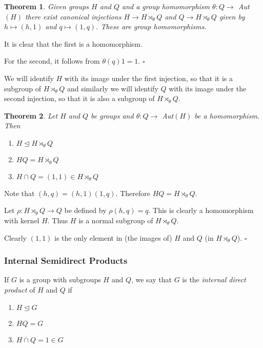 \documentclass[10pt]{article}
\newtheorem{theorem}{Theorem}[section]
\newenvironment{proof}[1][Proof]{\begin{trivlist}
\item[\hskip \labelsep {\itshape #1}]}{\end{trivlist}}
\newenvironment{definition}[1][Definition]{\begin{trivlist}
\item[\hskip \labelsep {\bfseries #1}]}{\end{trivlist}}
\begin{document}
\begin{theorem}
Given groups $H$ and $Q$ and a group homomorphism $\theta : Q \to$ Aut$(H)$ there exist canonical injections $H \to H\rtimes_{\theta} Q$ and $Q \to H\rtimes_{\theta} Q$ given by $h \mapsto (h, 1)$ and $q \mapsto (1, q)$. These are group homomorphisms.
\end{theorem}

\begin{proof}
It is clear that the first is a homomorphism.

For the second, it follows from $\theta(q)1 = 1$. $\square$
\end{proof}

We will identify $H$ with its image under the first injection, so that it is a subgroup of $H\rtimes_{\theta} Q$ and similarly we will identify $Q$ with its image under the second injection, so that it is also a subgroup of $H\rtimes_{\theta} Q$.

\begin{theorem}
Let $H$ and $Q$ be groups and $\theta : Q \to$ Aut$(H)$ be a homomorphism. Then
\begin{enumerate}
\item $H \mathrel{\unlhd} H\rtimes_{\theta} Q$
\item $HQ = H\rtimes_{\theta} Q$
\item $H\cap Q = (1, 1) \in H\rtimes_{\theta} Q$
\end{enumerate}
\end{theorem}

\begin{proof}
Note that $(h, q) = (h, 1)(1, q)$. Therefore $HQ = H\rtimes_{\theta} Q$.

Let $\rho : H\rtimes_{\theta} Q \to Q$ be defined by $\rho(h, q) = q$. This is clearly a homomorphism with kernel $H$. Thus $H$ is a normal subgroup of $H\rtimes_{\theta} Q$.

Clearly $(1, 1)$ is the only element in (the images of) $H$ and $Q$ (in $H\rtimes_{\theta} Q$). $\square$
\end{proof}

\subsubsection{Internal Semidirect Products}

\begin{definition}
If $G$ is a group with subgroups $H$ and $Q$, we say that $G$ is the \emph{internal direct product} of $H$ and $Q$ if
\begin{enumerate}
\item $H \mathrel{\unlhd} G$
\item $HQ = G$
\item $H\cap Q = 1 \in G$
\end{enumerate}
\end{definition}
\end{document}
